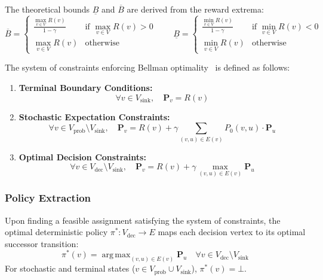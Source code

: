 \documentclass{article}
\begin{document}
The theoretical bounds $\underline{B}$ and $\overline{B}$ are derived from the reward extrema:
\begin{equation}
\overline{B} = 
\begin{cases} 
\frac{\max_{v \in V} R(v)}{1 - \gamma} & \text{if } \max_{v \in V} R(v) > 0 \\ 
\max_{v \in V} R(v) & \text{otherwise} 
\end{cases}
\qquad
\underline{B} = 
\begin{cases} 
\frac{\min_{v \in V} R(v)}{1 - \gamma} & \text{if } \min_{v \in V} R(v) < 0 \\ 
\min_{v \in V} R(v) & \text{otherwise} 
\end{cases}
\end{equation}

The system of constraints enforcing Bellman optimality~\cite{Bellman:1957:dynamic,Puterman:1994Markov} is defined as follows:

\begin{enumerate}
    \item \textbf{Terminal Boundary Conditions:}
    \begin{equation}
    \forall v \in V_{\text{sink}}, \quad \mathbf{P}_v = R(v)
    \end{equation}
    
    \item \textbf{Stochastic Expectation Constraints:}
    \begin{equation}
    \forall v \in V_{\text{prob}} \setminus V_{\text{sink}}, \quad \mathbf{P}_v = R(v) + \gamma \sum_{(v, u) \in E(v)} P_0(v, u) \cdot \mathbf{P}_u
    \end{equation}
    
    \item \textbf{Optimal Decision Constraints:}
    \begin{equation}
    \forall v \in V_{\text{dec}} \setminus V_{\text{sink}}, \quad \mathbf{P}_v = R(v) + \gamma \max_{(v, u) \in E(v)} \mathbf{P}_u
    \end{equation}
\end{enumerate}

\subsubsection{Policy Extraction}

Upon finding a feasible assignment satisfying the system of constraints, the optimal deterministic policy $\pi^* : V_{\text{dec}} \to E$ maps each decision vertex to its optimal successor transition:
\begin{equation}
\pi^*(v) = \operatorname{arg\,max}_{(v, u) \in E(v)} \mathbf{P}_u \quad \forall v \in V_{\text{dec}} \setminus V_{\text{sink}}
\end{equation}
For stochastic and terminal states ($v \in V_{\text{prob}} \cup V_{\text{sink}}$), $\pi^*(v) = \bot$.
\end{document}
